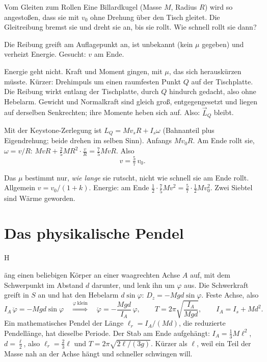 \documentclass[deutsch]{kaelearn}
\newcommand\step[1]{\par\smallskip\noindent{\color{kldim}\pix{#1}}\quad}
\begin{document}
\begin{example}{Vom Gleiten zum Rollen}
Eine Billardkugel (Masse $M$, Radius $R$) wird so angestoßen, dass sie mit $v_0$ ohne Drehung über den Tisch gleitet. Die Gleitreibung bremst
sie und dreht sie an, bis sie rollt. Wie schnell rollt sie dann?
\step{Verstehen} Die Reibung greift am Auflagepunkt an, ist unbekannt (kein $\mu$ gegeben) und verheizt Energie. Gesucht: $v$ am Ende.
\step{Plan} Energie geht nicht. Kraft und Moment gingen, mit $\mu$, das sich herauskürzen müsste. Kürzer: Drehimpuls um einen raumfesten
Punkt $Q$ auf der Tischplatte. Die Reibung wirkt entlang der Tischplatte, durch $Q$ hindurch gedacht, also ohne Hebelarm. Gewicht und
Normalkraft sind gleich groß, entgegengesetzt und liegen auf derselben Senkrechten; ihre Momente heben sich auf. Also: $\vec L_Q$ bleibt.
\step{Rechnung} Mit der Keystone-Zerlegung ist $L_Q = Mv_sR+I_s\omega$ (Bahnanteil plus Eigendrehung; beide drehen im selben Sinn).
Anfangs $Mv_0R$. Am Ende rollt sie, $\omega = v/R$: $MvR+\frac25MR^2\cdot\frac vR = \frac75MvR$. Also
\[
  v = \tfrac57\,v_0 .
\]
\step{Rückschau} Das $\mu$ bestimmt nur, \emph{wie lange} sie rutscht, nicht wie schnell sie am Ende rollt. Allgemein $v = v_0/(1+k)$. Energie:
am Ende $\frac12\cdot\frac75Mv^2 = \frac57\cdot\frac12Mv_0^2$. Zwei Siebtel sind Wärme geworden.
\end{example}

\section{Das physikalische Pendel}

\opening{H}{äng einen} beliebigen Körper an einer waagrechten Achse $A$ auf, mit dem Schwerpunkt im Abstand $d$ darunter, und lenk ihn um
$\varphi$ aus. Die Schwerkraft greift in $S$ an und hat den Hebelarm $d\sin\varphi$: $D_z = -Mgd\sin\varphi$. Feste Achse, also
\[
  I_A\,\ddot\varphi = -Mgd\sin\varphi \quad\stackrel{\varphi\ \mathrm{klein}}{\Longrightarrow}\quad
  \ddot\varphi = -\frac{Mgd}{I_A}\,\varphi,\qquad T = 2\pi\sqrt{\frac{I_A}{Mgd}},\qquad I_A = I_s+Md^2 .
\]
Ein mathematisches Pendel der Länge $\ell_r = I_A/(Md)$, die reduzierte Pendellänge, hat dieselbe Periode. Der Stab am Ende aufgehängt:
$I_A = \frac13M\ell^2$, $d = \frac\ell2$, also $\ell_r = \frac23\ell$ und $T = 2\pi\sqrt{2\ell/(3g)}$. Kürzer als $\ell$, weil ein Teil der
Masse nah an der Achse hängt und schneller schwingen will.
\end{document}
